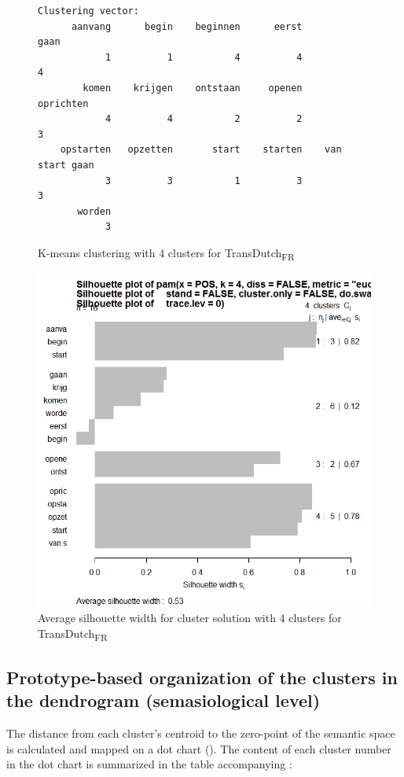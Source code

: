 \begin{figure}
\footnotesize
\begin{lstlisting}
Clustering vector:
      aanvang      begin    beginnen      eerst              gaan 
            1          1           4          4                 4
        komen    krijgen    ontstaan     openen         oprichten
            4          4           2          2                 3
    opstarten   opzetten       start    starten    van start gaan
            3          3           1          3                 3
       worden               
            3               
\end{lstlisting}
\caption{\label{fig:4:kmeansdutch4}  K-means clustering with 4 clusters for TransDutch\textsubscript{FR}}
\end{figure}

\begin{figure}
\includegraphics[height=.4\textheight]{figures/Vandevoorde2-img80.png}
\caption{\label{fig:4:77}  Average silhouette width for cluster solution with 4 clusters for TransDutch\textsubscript{FR}}
\end{figure}

\subsection{Prototype-based organization of the clusters in the dendrogram (semasiological level)}
\label{sec:4.4.2}  
The distance from each cluster’s centroid to the zero-point of the semantic space is calculated and mapped on a dot chart (). The content of each cluster number in the dot chart is summarized in the table accompanying :

